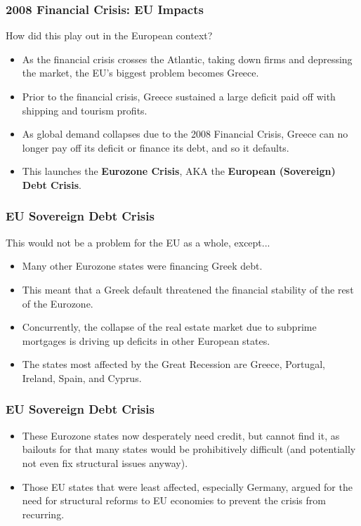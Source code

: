 \documentclass[handout]{beamer}
\begin{document}
\begin{frame} 
	\frametitle{\LARGE{2008 Financial Crisis: EU Impacts}}
	How did this play out in the European context? \pause
	\begin{itemize}
		\item As the financial crisis crosses the Atlantic, taking down firms and depressing the market, the EU's biggest problem becomes Greece. \pause
		\item Prior to the financial crisis, Greece sustained a large deficit paid off with shipping and tourism profits. \pause
		\item As global demand collapses due to the 2008 Financial Crisis, Greece can no longer pay off its deficit or finance its debt, and so it defaults.	\pause
		\item This launches the \textbf{Eurozone Crisis}, AKA the \textbf{European (Sovereign) Debt Crisis}.
	\end{itemize}
\end{frame}

\begin{frame} 
	\frametitle{\LARGE{EU Sovereign Debt Crisis}}
	This would not be a problem for the EU as a whole, except...
	\begin{itemize}
		\item Many other Eurozone states were financing Greek debt.
		\item This meant that a Greek default threatened the financial stability of the rest of the Eurozone. \pause
		\item Concurrently, the collapse of the real estate market due to subprime mortgages is driving up deficits in other European states. \pause
		\item The states most affected by the Great Recession are Greece, Portugal, Ireland, Spain, and Cyprus. 
	\end{itemize}
\end{frame}

\begin{frame} 
	\frametitle{\LARGE{EU Sovereign Debt Crisis}}
	
	\begin{itemize}
		\item These Eurozone states now desperately need credit, but cannot find it, as bailouts for that many states would be prohibitively difficult (and potentially not even fix structural issues anyway).\pause
		\item Those EU states that were least affected, especially Germany, argued for the need for structural reforms to EU economies to prevent the crisis from recurring.
	\end{itemize}
\end{frame}
\end{document}
